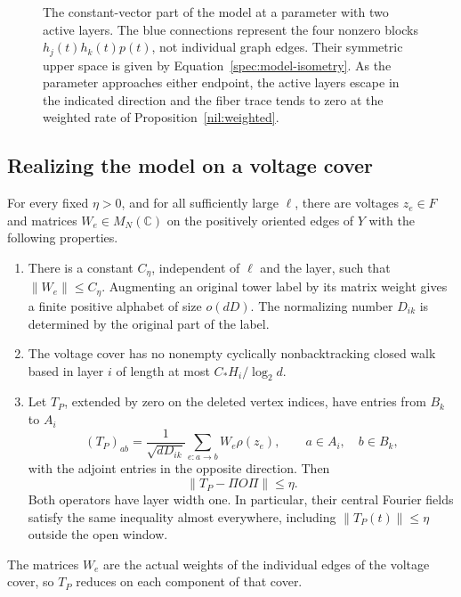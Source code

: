 \begin{figure}[htbp]
\centering

\caption{The constant-vector part of the model at a parameter with two
active layers. The blue connections represent the four nonzero blocks
\(h_j(t)h_k(t)p(t)\), not individual graph edges. Their symmetric upper
space is given by Equation~\eqref{spec:model-isometry}. As the parameter
approaches either endpoint, the active layers escape in the indicated
direction and the fiber trace tends to zero at the weighted rate of
Proposition~\ref{nil:weighted}.}
\label{fig:moving-band}
\end{figure}

\subsection{Realizing the model on a voltage cover}

\begin{theorem}\label{sam:realization}
For every fixed \(\eta>0\), and for all sufficiently large \(\ell\),
there are voltages \(z_e\in F\) and matrices \(W_e\in M_N(\mathbb C)\)
on the positively oriented edges of \(Y\) with the following properties.
\begin{enumerate}
\item There is a constant \(C_\eta\), independent of \(\ell\) and the
layer, such that \(\|W_e\|\le C_\eta\).  Augmenting an original tower
label by its matrix weight gives a finite positive alphabet of size
\(o(dD)\).  The normalizing number \(D_{ik}\) is determined by the
original part of the label.
\item The voltage cover has no nonempty cyclically nonbacktracking
closed walk based in layer \(i\) of length at most
\(C_*H_i/\log_2d\).
\item Let \(T_P\), extended by zero on the deleted vertex indices, have
entries from \(B_k\) to \(A_i\)
\begin{equation}\label{sam:entries}
 (T_P)_{ab}=
 \frac1{\sqrt{dD_{ik}}}\sum_{e:a\to b}W_e\rho(z_e),
 \qquad a\in A_i,\quad b\in B_k,
\end{equation}
with the adjoint entries in the opposite direction.  Then
\begin{equation}\label{sam:approx}
 \|T_P-\Pi O\Pi\|\le\eta.
\end{equation}
Both operators have layer width one.  In particular, their central
Fourier fields satisfy the same inequality almost everywhere, including
\(\|T_P(t)\|\le\eta\) outside the open window.
\end{enumerate}
The matrices \(W_e\) are the actual weights of the individual edges of
the voltage cover, so \(T_P\) reduces on each component of that cover.
\end{theorem}

